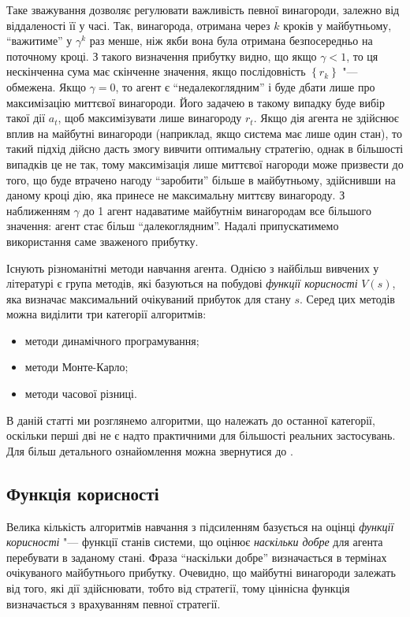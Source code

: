 \documentclass[a4paper,10pt,fleqn]{article}
\begin{document}
Таке зважування дозволяє регулювати важливість певної винагороди, залежно від віддаленості її у часі. Так, винагорода, отримана через $k$ кроків у майбутньому, ``важитиме'' у $\gamma^k$ раз менше, ніж якби вона була отримана безпосередньо на поточному кроці. З такого визначення прибутку видно, що якщо $\gamma<1$, то ця нескінченна сума має скінченне значення, якщо послідовність $\left\{r_k\right\}$ "--- обмежена. Якщо $\gamma = 0$, то агент є ``недалекоглядним'' і буде дбати лише про максимізацію миттєвої винагороди. Його задачею в такому випадку буде вибір такої дії $a_t$, щоб максимізувати лише винагороду $r_{t}$. Якщо дія агента не здійснює вплив на майбутні винагороди (наприклад, якщо система має лише один стан), то такий підхід дійсно дасть змогу вивчити оптимальну стратегію, однак в більшості випадків це не так, тому максимізація лише миттєвої нагороди може призвести до того, що буде втрачено нагоду ``заробити'' більше в майбутньому, здійснивши на даному кроці дію, яка принесе не максимальну миттєву винагороду. З наближенням $\gamma$ до 1 агент надаватиме майбутнім винагородам все більшого значення: агент стає більш ``далекоглядним''. Надалі припускатимемо використання саме зваженого прибутку.

Існують різноманітні методи навчання агента. Однією з найбільш вивчених у літературі є група методів, які базуються на побудові \emph{функції корисності} $V(s)$, яка визначає максимальний очікуваний прибуток для стану $s$. Серед цих методів можна виділити три категорії алгоритмів:

\begin{itemize}
\item методи динамічного програмування;
\item методи Монте-Карло;
\item методи часової різниці.
\end{itemize}

В даній статті ми розглянемо алгоритми, що належать до останної категорії, оскільки перші дві не є надто практичними для більшості реальних застосувань. Для більш детального ознайомлення можна звернутися до \cite{SuttonBarto2002}.

\subsection{Функція корисності}

Велика кількість алгоритмів навчання з підсиленням базується на оцінці \emph{функції корисності} "--- функції станів системи, що оцінює \emph{наскільки добре} для агента перебувати в заданому стані. Фраза ``наскільки добре'' визначається в термінах очікуваного майбутнього прибутку. Очевидно, що майбутні винагороди залежать від того, які дії здійснювати, тобто від стратегії, тому ціннісна функція визначається з врахуванням певної стратегії.
\end{document}
